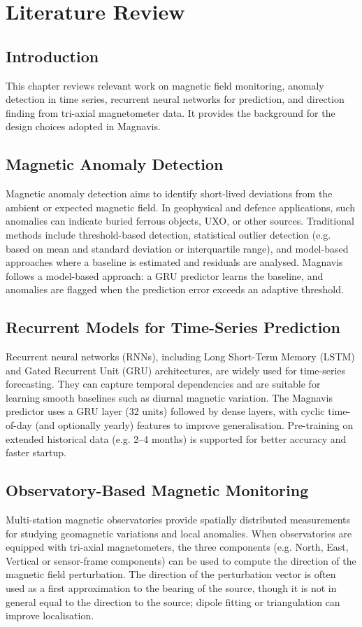\chapter{Literature Review}
\label{Chapter2}

\section{Introduction}
This chapter reviews relevant work on magnetic field monitoring, anomaly detection in time series, recurrent neural networks for prediction, and direction finding from tri-axial magnetometer data. It provides the background for the design choices adopted in Magnavis.

\section{Magnetic Anomaly Detection}
Magnetic anomaly detection aims to identify short-lived deviations from the ambient or expected magnetic field. In geophysical and defence applications, such anomalies can indicate buried ferrous objects, UXO, or other sources. Traditional methods include threshold-based detection, statistical outlier detection (e.g. based on mean and standard deviation or interquartile range), and model-based approaches where a baseline is estimated and residuals are analysed. Magnavis follows a model-based approach: a GRU predictor learns the baseline, and anomalies are flagged when the prediction error exceeds an adaptive threshold.

\section{Recurrent Models for Time-Series Prediction}
Recurrent neural networks (RNNs), including Long Short-Term Memory (LSTM) and Gated Recurrent Unit (GRU) architectures, are widely used for time-series forecasting. They can capture temporal dependencies and are suitable for learning smooth baselines such as diurnal magnetic variation. The Magnavis predictor uses a GRU layer (32 units) followed by dense layers, with cyclic time-of-day (and optionally yearly) features to improve generalisation. Pre-training on extended historical data (e.g. 2--4 months) is supported for better accuracy and faster startup.

\section{Observatory-Based Magnetic Monitoring}
Multi-station magnetic observatories provide spatially distributed measurements for studying geomagnetic variations and local anomalies. When observatories are equipped with tri-axial magnetometers, the three components (e.g. North, East, Vertical or sensor-frame components) can be used to compute the direction of the magnetic field perturbation. The direction of the perturbation vector is often used as a first approximation to the bearing of the source, though it is not in general equal to the direction to the source; dipole fitting or triangulation can improve localisation.

